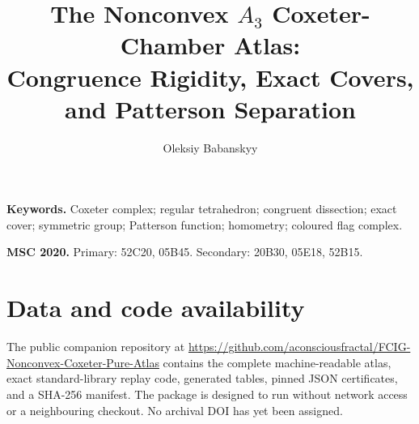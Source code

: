 \documentclass[11pt,a4paper]{amsart}
\title[The nonconvex $A_3$ chamber atlas]
{The Nonconvex $A_3$ Coxeter-Chamber Atlas:\\
Congruence Rigidity, Exact Covers, and Patterson Separation}
\author{Oleksiy Babanskyy}
\date{}
\begin{document}
\begin{abstract}

\end{abstract}
\maketitle

\noindent\textbf{Keywords.}
Coxeter complex; regular tetrahedron; congruent dissection; exact cover;
symmetric group; Patterson function; homometry; coloured flag complex.

\smallskip
\noindent\textbf{MSC 2020.}
Primary: 52C20, 05B45. Secondary: 20B30, 05E18, 52B15.

\tableofcontents












\appendix




\section*{Data and code availability}
The public companion repository at
\url{https://github.com/aconsciousfractal/FCIG-Nonconvex-Coxeter-Pure-Atlas}
contains the complete machine-readable atlas, exact standard-library replay
code, generated tables, pinned JSON certificates, and a SHA-256 manifest.
The package is designed to run without network access or a neighbouring
checkout.  No archival DOI has yet been assigned.



\end{document}
